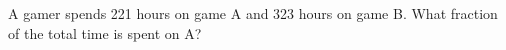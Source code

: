 A gamer spends 221 hours on game A and 323 hours on game B. What fraction of the total time is spent on A?
